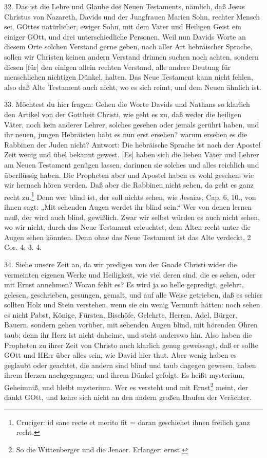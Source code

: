 32. Das ist die Lehre und Glaube des Neuen Testaments, nämlich, daß Jesus Christus von Nazareth, Davids und der Jungfrauen Marien Sohn, rechter Mensch sei, GOttes natürlicher, ewiger Sohn, mit dem Vater und Heiligen Geist ein einiger GOtt, und drei unterschiedliche Personen. Weil nun Davids Worte an diesem Orte solchen Verstand gerne geben, nach aller Art hebräischer Sprache, sollen wir Christen keinen andern Verstand drinnen suchen noch achten, sondern diesen [für] den einigen allein rechten Verstand, alle andere Deutung für menschlichen nichtigen Dünkel, halten. Das Neue Testament kann nicht fehlen, also daß Alte Testament auch nicht, wo es sich reimt, und dem Neuen ähnlich ist.

33. Möchtest du hier fragen: Gehen die Worte Davids und Nathans so klarlich den Artikel von der Gottheit Christi, wie geht es zu, daß weder die heiligen Väter, noch kein anderer Lehrer, solches gesehen oder jemals gerührt haben, und ihr neuen, jungen Hebräisten habt es nun erst ersehen? warum ersehen es die Rabbinen der Juden nicht? Antwort: Die hebräische Sprache ist nach der Apostel Zeit wenig und übel bekannt gewest. [Es] haben sich die lieben Väter und Lehrer am Neuen Testament genügen lassen, darinnen sie solches und alles reichlich und überflüssig haben. Die Propheten aber und Apostel haben es wohl gesehen; wie wir hernach hören werden. Daß aber die Rabbinen nicht sehen, da geht es ganz recht zu.\footnote{Cruciger: id sane recte et merito fit = daran geschiehet ihnen freilich ganz recht.} Denn wer blind ist, der soll nichts sehen, wie Jesaias, Cap. 6, 10., von ihnen sagt: „Mit sehenden Augen werdet ihr blind sein.“ Wer von denen lernen muß, der wird auch blind, gewißlich. Zwar wir selbst würden es auch nicht sehen, wo wir nicht, durch das Neue Testament erleuchtet, dem Alten recht unter die Augen sehen könnten. Denn ohne das Neue Testament ist das Alte verdeckt, 2 Cor. 4, 3. 4.

34. Siehe unsere Zeit an, da wir predigen von der Gnade Christi wider die vermeinten eigenen Werke und Heiligkeit, wie viel deren sind, die es sehen, oder mit Ernst annehmen? Woran fehlt es? Es wird ja so helle gepredigt, gelehrt, gelesen, geschrieben, gesungen, gemalt, und auf alle Weise getrieben, daß es schier sollten Holz und Stein verstehen, wenn sie ein wenig Vernunft hätten: noch sehen es nicht Pabst, Könige, Fürsten, Bischöfe, Gelehrte, Herren, Adel, Bürger, Bauern, sondern gehen vorüber, mit sehenden Augen blind, mit hörenden Ohren taub; denn ihr Herz ist nicht daheime, und steht anderswo hin. Also haben die Propheten zu ihrer Zeit von Christo auch klarlich genug geweissagt, daß er sollte GOtt und HErr über alles sein, wie David hier thut. Aber wenig haben es geglaubt oder geachtet, die andern sind blind und taub dagegen gewesen, haben ihrem Herzen nachgegangen, und ihrem Dünkel gefolgt. Es heißt mysterium, Geheimniß, und bleibt mysterium. Wer es versteht und mit Ernst\footnote{So die Wittenberger und die Jenaer. Erlanger: ernst.} meint, der dankt GOtt, und kehre sich nicht an den andern großen Haufen der Verächter.

